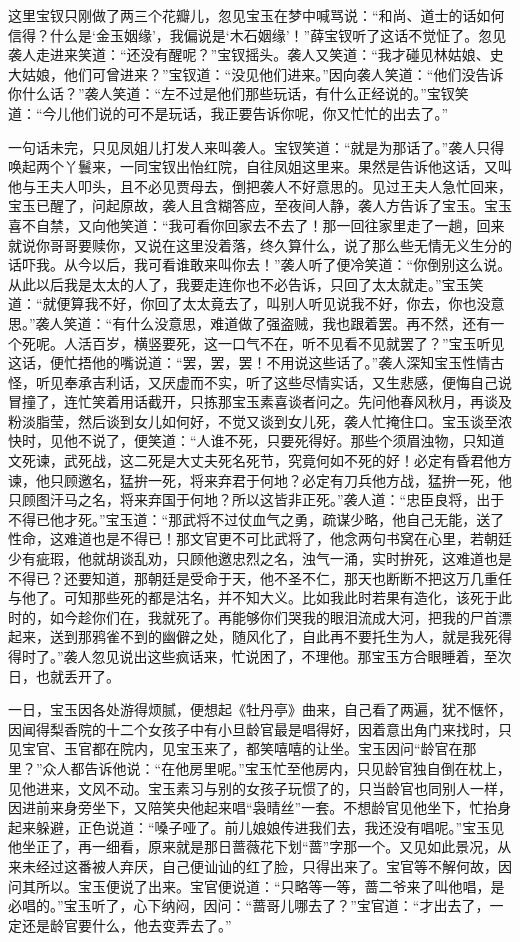 \documentclass[12pt,oneside]{book}
\begin{document}
这里宝钗只刚做了两三个花瓣儿，忽见宝玉在梦中喊骂说：“和尚、道士的话如何信得？什么是‘金玉姻缘’，我偏说是‘木石姻缘’！”薛宝钗听了这话不觉怔了。忽见袭人走进来笑道：“还没有醒呢？”宝钗摇头。袭人又笑道：“我才碰见林姑娘、史大姑娘，他们可曾进来？”宝钗道：“没见他们进来。”因向袭人笑道：“他们没告诉你什么话？”袭人笑道：“左不过是他们那些玩话，有什么正经说的。”宝钗笑道：“今儿他们说的可不是玩话，我正要告诉你呢，你又忙忙的出去了。”

一句话未完，只见凤姐儿打发人来叫袭人。宝钗笑道：“就是为那话了。”袭人只得唤起两个丫鬟来，一同宝钗出怡红院，自往凤姐这里来。果然是告诉他这话，又叫他与王夫人叩头，且不必见贾母去，倒把袭人不好意思的。见过王夫人急忙回来，宝玉已醒了，问起原故，袭人且含糊答应，至夜间人静，袭人方告诉了宝玉。宝玉喜不自禁，又向他笑道：“我可看你回家去不去了！那一回往家里走了一趟，回来就说你哥哥要赎你，又说在这里没着落，终久算什么，说了那么些无情无义生分的话吓我。从今以后，我可看谁敢来叫你去！”袭人听了便冷笑道：“你倒别这么说。从此以后我是太太的人了，我要走连你也不必告诉，只回了太太就走。”宝玉笑道：“就便算我不好，你回了太太竟去了，叫别人听见说我不好，你去，你也没意思。”袭人笑道：“有什么没意思，难道做了强盗贼，我也跟着罢。再不然，还有一个死呢。人活百岁，横竖要死，这一口气不在，听不见看不见就罢了？”宝玉听见这话，便忙捂他的嘴说道：“罢，罢，罢！不用说这些话了。”袭人深知宝玉性情古怪，听见奉承吉利话，又厌虚而不实，听了这些尽情实话，又生悲感，便悔自己说冒撞了，连忙笑着用话截开，只拣那宝玉素喜谈者问之。先问他春风秋月，再谈及粉淡脂莹，然后谈到女儿如何好，不觉又谈到女儿死，袭人忙掩住口。宝玉谈至浓快时，见他不说了，便笑道：“人谁不死，只要死得好。那些个须眉浊物，只知道文死谏，武死战，这二死是大丈夫死名死节，究竟何如不死的好！必定有昏君他方谏，他只顾邀名，猛拚一死，将来弃君于何地？必定有刀兵他方战，猛拚一死，他只顾图汗马之名，将来弃国于何地？所以这皆非正死。”袭人道：“忠臣良将，出于不得已他才死。”宝玉道：“那武将不过仗血气之勇，疏谋少略，他自己无能，送了性命，这难道也是不得已！那文官更不可比武将了，他念两句书窝在心里，若朝廷少有疵瑕，他就胡谈乱劝，只顾他邀忠烈之名，浊气一涌，实时拚死，这难道也是不得已？还要知道，那朝廷是受命于天，他不圣不仁，那天也断断不把这万几重任与他了。可知那些死的都是沽名，并不知大义。比如我此时若果有造化，该死于此时的，如今趁你们在，我就死了。再能够你们哭我的眼泪流成大河，把我的尸首漂起来，送到那鸦雀不到的幽僻之处，随风化了，自此再不要托生为人，就是我死得得时了。”袭人忽见说出这些疯话来，忙说困了，不理他。那宝玉方合眼睡着，至次日，也就丢开了。

一日，宝玉因各处游得烦腻，便想起《牡丹亭》曲来，自己看了两遍，犹不惬怀，因闻得梨香院的十二个女孩子中有小旦龄官最是唱得好，因着意出角门来找时，只见宝官、玉官都在院内，见宝玉来了，都笑嘻嘻的让坐。宝玉因问“龄官在那里？”众人都告诉他说：“在他房里呢。”宝玉忙至他房内，只见龄官独自倒在枕上，见他进来，文风不动。宝玉素习与别的女孩子玩惯了的，只当龄官也同别人一样，因进前来身旁坐下，又陪笑央他起来唱“袅晴丝”一套。不想龄官见他坐下，忙抬身起来躲避，正色说道：“嗓子哑了。前儿娘娘传进我们去，我还没有唱呢。”宝玉见他坐正了，再一细看，原来就是那日蔷薇花下划“蔷”字那一个。又见如此景况，从来未经过这番被人弃厌，自己便讪讪的红了脸，只得出来了。宝官等不解何故，因问其所以。宝玉便说了出来。宝官便说道：“只略等一等，蔷二爷来了叫他唱，是必唱的。”宝玉听了，心下纳闷，因问：“蔷哥儿哪去了？”宝官道：“才出去了，一定还是龄官要什么，他去变弄去了。”
\end{document}
